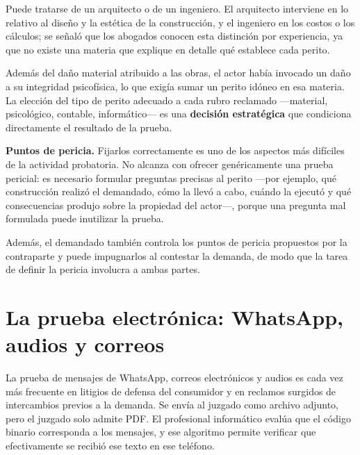 \documentclass[12pt,oneside]{book}
\begin{document}
Puede tratarse de un arquitecto o de un ingeniero. El arquitecto interviene en lo relativo al diseño y la estética de la construcción, y el ingeniero en los costos o los cálculos; se señaló que los abogados conocen esta distinción por experiencia, ya que no existe una materia que explique en detalle qué establece cada perito.

Además del daño material atribuido a las obras, el actor había invocado un daño a su integridad psicofísica, lo que exigía sumar un perito idóneo en esa materia. La elección del tipo de perito adecuado a cada rubro reclamado ---material, psicológico, contable, informático--- es una \textbf{decisión estratégica} que condiciona directamente el resultado de la prueba.

\begin{important}
\textbf{Puntos de pericia.} Fijarlos correctamente es uno de los aspectos más difíciles de la actividad probatoria. No alcanza con ofrecer genéricamente una prueba pericial: es necesario formular preguntas precisas al perito ---por ejemplo, qué construcción realizó el demandado, cómo la llevó a cabo, cuándo la ejecutó y qué consecuencias produjo sobre la propiedad del actor---, porque una pregunta mal formulada puede inutilizar la prueba.

Además, el demandado también controla los puntos de pericia propuestos por la contraparte y puede impugnarlos al contestar la demanda, de modo que la tarea de definir la pericia involucra a ambas partes.
\end{important}

\section{La prueba electrónica: WhatsApp, audios y correos}

La prueba de mensajes de WhatsApp, correos electrónicos y audios es cada vez más frecuente en litigios de defensa del consumidor y en reclamos surgidos de intercambios previos a la demanda. Se envía al juzgado como archivo adjunto, pero el juzgado solo admite PDF. El profesional informático evalúa que el código binario corresponda a los mensajes, y ese algoritmo permite verificar que efectivamente se recibió ese texto en ese teléfono.
\end{document}
